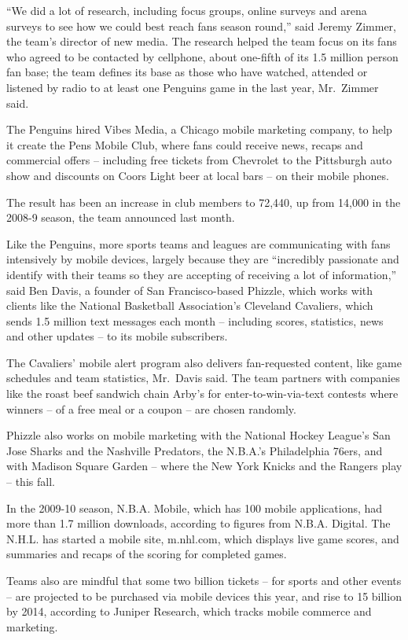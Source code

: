 ﻿\documentclass[12pt]{article}
\begin{document}
``We did a lot of research, including focus groups, online surveys and arena surveys to see how we
could best reach fans season round,'' said Jeremy Zimmer, the team's director of new media. The
research helped the team focus on its fans who agreed to be contacted by cellphone, about one-fifth
of its 1.5 million person fan base; the team defines its base as those who have watched, attended or
listened by radio to at least one Penguins game in the last year, Mr.~Zimmer said.

The Penguins hired Vibes Media, a Chicago mobile marketing company, to help it create the Pens
Mobile Club, where fans could receive news, recaps and commercial offers -- including free tickets
from Chevrolet to the Pittsburgh auto show and discounts on Coors Light beer at local bars -- on
their mobile phones.

The result has been an increase in club members to 72,440, up from 14,000 in the 2008-9 season, the
team announced last month.

Like the Penguins, more sports teams and leagues are communicating with fans intensively by mobile
devices, largely because they are ``incredibly passionate and identify with their teams so they are
accepting of receiving a lot of information,'' said Ben Davis, a founder of San Francisco-based
Phizzle, which works with clients like the National Basketball Association's Cleveland Cavaliers,
which sends 1.5 million text messages each month -- including scores, statistics, news and other
updates -- to its mobile subscribers.

The Cavaliers' mobile alert program also delivers fan-requested content, like game schedules and
team statistics, Mr.~Davis said. The team partners with companies like the roast beef sandwich chain
Arby's for enter-to-win-via-text contests where winners -- of a free meal or a coupon -- are chosen
randomly.

Phizzle also works on mobile marketing with the National Hockey League's San Jose Sharks and the
Nashville Predators, the N.B.A.'s Philadelphia 76ers, and with Madison Square Garden -- where the
New York Knicks and the Rangers play -- this fall.

In the 2009-10 season, N.B.A. Mobile, which has 100 mobile applications, had more than 1.7 million
downloads, according to figures from N.B.A. Digital. The N.H.L. has started a mobile site,
m.nhl.com, which displays live game scores, and summaries and recaps of the scoring for completed
games.

Teams also are mindful that some two billion tickets -- for sports and other events -- are projected
to be purchased via mobile devices this year, and rise to 15 billion by 2014, according to Juniper
Research, which tracks mobile commerce and marketing.
\end{document}
